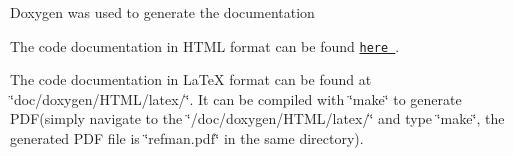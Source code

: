 Doxygen was used to generate the documentation


\begin{DoxyItemize}
\item The code documentation in H\-T\-M\-L format can be found \href{https://turbulence-master.github.io/Doc-MeshGeneration-Framework/index.html}{\tt here }.
\item The code documentation in La\-Te\-X format can be found at \char`\"{}doc/doxygen/\-H\-T\-M\-L/latex/\char`\"{}. It can be compiled with \char`\"{}make\char`\"{} to generate P\-D\-F(simply navigate to the \char`\"{}/doc/doxygen/\-H\-T\-M\-L/latex/\char`\"{} and type \char`\"{}make\char`\"{}, the generated P\-D\-F file is \char`\"{}refman.\-pdf\char`\"{} in the same directory). 
\end{DoxyItemize}
